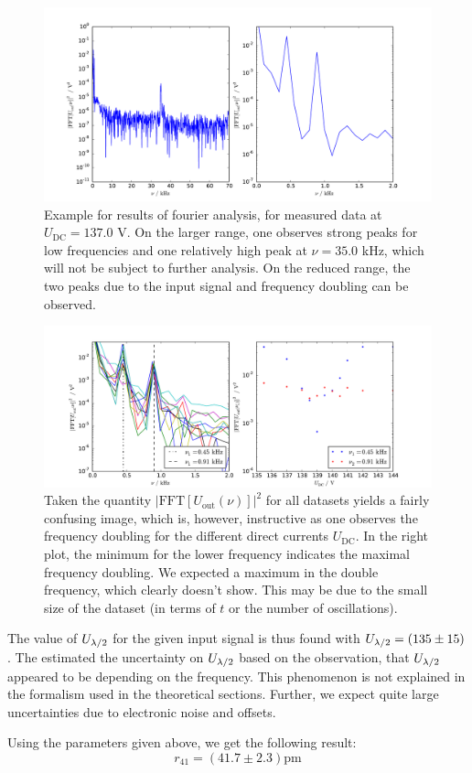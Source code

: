 \begin{figure}
\includegraphics[width=\textwidth]{figures/fft_example.pdf}
\caption{
    Example for results of fourier analysis, for measured data at 
    $U_\mathrm{DC} = 137.0$ V.
    On the larger range, one observes strong peaks for low frequencies 
    and one relatively high peak at $\nu = 35.0$ kHz, which will not be 
    subject to further analysis. On the reduced range, the two peaks 
    due to the input signal and frequency doubling can be observed. 
    }
\label{fig:fourier_example}
\end{figure}

\begin{figure}
\includegraphics[width=1.0\textwidth]{figures/fft_all.pdf}
\caption{
    Taken the quantity
    $|\mathrm{FFT}\left[U_\mathrm{out} \left(\nu\right)\right]|^2$ 
    for all datasets yields a fairly confusing image, 
    which is, however, instructive as one observes the 
    frequency doubling for the different direct currents 
    $U_\mathrm{DC}$.
    In the right plot, the minimum for the lower frequency indicates 
    the maximal frequency doubling. We expected a maximum in the 
    double frequency, which clearly doesn't show. This 
    may be due to the small size of the dataset (in terms 
        of $t$ or the number of oscillations). 
    }
\label{fig:fft_all}
\end{figure}

The value of $U_{\lambda/2}$ for the given input signal is thus 
found with $U_{\lambda/2} = (135  \pm 15)$. 
The estimated the uncertainty on $U_{\lambda/2}$ based on the 
observation, that $U_{\lambda/2}$ appeared to be 
depending on the frequency. This phenomenon is not 
explained in the formalism used in the theoretical sections. 
Further, we expect quite large uncertainties due to 
electronic noise and offsets. 

Using the parameters given above, we get the following result: 
\begin{equation*}
r_{41} = \left (41.7 \pm 2.3 \right )  \mathrm{pm}
\end{equation*}
